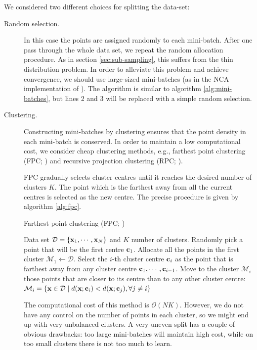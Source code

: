 We considered two different choices for splitting the data-set:
\begin{description}
	\item[Random selection.] In this case the points are assigned randomly to each
mini-batch. After one pass through the whole data set, we repeat the random
allocation procedure. As in section \ref{sec:sub-sampling}, this suffers from the
thin distribution problem. In order to alleviate this problem and achieve convergence,
we should use large-sized mini-batches (as in the NCA
implementation of \citealp{maaten-online}). The algorithm is similar to algorithm \ref{alg:mini-batches},
but lines 2 and 3 will be replaced with a simple random selection.
	
	\item[Clustering.] Constructing mini-batches by clustering ensures that the
point density in each mini-batch is conserved. In order to maintain a low
computational cost, we consider cheap clustering methods, e.g.,
farthest point clustering (FPC; \citealp{gonzalez1985}) and recursive projection
clustering (RPC; \citealp{chalupka2011}).  
	
	FPC gradually selects cluster centres until it reaches the desired number of
clusters $K$. The point which is the farthest away from all the current centres
is selected as the new centre. The precise procedure is given by algorithm \ref{alg:fpc}.
	
	\begin{algorithm} 
		\caption{Farthest point clustering (FPC; \citealp{gonzalez1985})} 
		\label{alg:fpc}  
		\begin{algorithmic}[1]                    %
			\REQUIRE Data set $\mathcal{D}=\{\mathbf{x}_1,\cdots,\mathbf{x}_N\}$ and $K$ number of
clusters.
			\STATE Randomly pick a point that will be the first centre $\mathbf{c}_1$.
			\STATE Allocate all the points in the first cluster $\mathcal{M}_1 \leftarrow
\mathcal{D}$.
				\STATE Select the $i$-th cluster centre $\mathbf{c}_i$ as the point that is
farthest away from any cluster centre $\mathbf{c}_1,\cdots,\mathbf{c}_{i-1}$.
				\STATE Move to the cluster $\mathcal{M}_i$ those points that are closer to
its centre than to any other cluster centre: $\mathcal{M}_i = \left\{ \mathbf{x} \in
\mathcal{D} \;| \; d(\mathbf{x};\mathbf{c}_i) < d(\mathbf{x};\mathbf{c}_j), \forall j \neq i \right\}$
			\ENDFOR
		\end{algorithmic}
	\end{algorithm}
	
	The computational cost of this method is $\mathcal{O}(NK)$. However, we do not
have any control on the number of points in each cluster, so we might end up
with very unbalanced clusters. A very uneven split has a couple of obvious
drawbacks: too large mini-batches will maintain high cost, while on too small
clusters there is not too much to learn.
	

\end{description}
